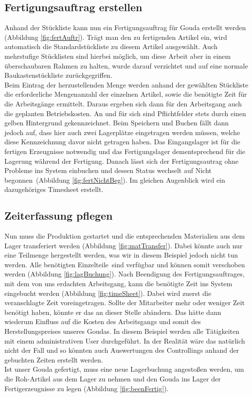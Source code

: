 \subsection{Fertigungsauftrag erstellen}
Anhand der Stückliste kann nun ein Fertigungsauftrag für Gouda erstellt werden (\vgl Abbildung \ref{fig:fertAuftr}). Trägt man den zu fertigenden Artikel ein, wird automatisch die Standardstückliste zu diesem Artikel ausgewählt. Auch mehrstufige Stücklisten sind hierbei möglich, um diese Arbeit aber in einem überschaubaren Rahmen zu halten, wurde darauf verzichtet und auf eine normale Baukastenstückliste zurückgegriffen. \\
Beim Eintrag der herzustellenden Menge werden anhand der gewählten Stückliste die erforderliche Mengenanzahl der einzelnen Artikel, sowie die benötigte Zeit für die Arbeitsgänge ermittelt. Daraus ergeben sich dann für den Arbeitsgang auch die geplanten Betriebskosten.
An und für sich sind Pflichtfelder stets durch einen gelben Hintergrund gekennzeichnet. Beim Speichern und Buchen fällt dann jedoch auf, dass hier auch zwei Lagerplätze eingetragen werden müssen, welche diese Kennzeichnung davor nicht getragen haben. Das Eingangslager ist für die fertigen Erzeugnisse notwendig und das Fertigungslager dementsprechend für die Lagerung während der Fertigung. Danach lässt sich der Fertigungsautrag ohne Probleme ins System einbuchen und dessen Status wechselt auf \glqq Nicht begonnen\grqq\ (\vgl Abbildung \ref{fig:fertNichtBeg}). Im gleichen Augenblick wird ein dazugehöriges Timesheet erstellt.

\subsection{Zeiterfassung pflegen}
Nun muss die Produktion gestartet und die entsprechenden Materialien aus dem Lager transferiert werden (\vgl Abbildung \ref{fig:matTransfer}). Dabei könnte auch nur eine Teilmenge hergestellt werden, was wir in diesem Beispiel jedoch nicht tun werden. Alle benötigten \glqq Einzelteile\grqq\ sind verfügbar und können somit verschoben werden (\vgl Abbildung \ref{fig:lagBuchung}). Nach Beendigung des Fertigungsauftrages, mit dem von uns erdachten Arbeitsgang, kann die benötigte Zeit ins System eingebucht werden (\vgl Abbildung \ref{fig:timeSheet}). Dabei wird zuerst die veranschlagte Zeit voreingetragen. Sollte der Mitarbeiter mehr oder weniger Zeit benötigt haben, könnte er das an dieser Stelle abändern. Das hätte dann wiederum Einfluss auf die Kosten des Arbeitsgangs und somit des Herstellungspreises unseres Goudas. In diesem Beispiel werden alle Tätigkeiten mit einem administrativen User durchgeführt. In der Realität wäre das natürlich nicht der Fall und so könnten auch Auswertungen des Controllings anhand der gebuchten Zeiten erstellt werden. \\
Ist unser Gouda gefertigt, muss eine neue Lagerbuchung angestoßen werden, um die Roh-Artikel aus dem Lager zu nehmen und den Gouda ins Lager der Fertigerzeugnisse zu legen (\vgl Abbildung \ref{fig:beenFertig}).


